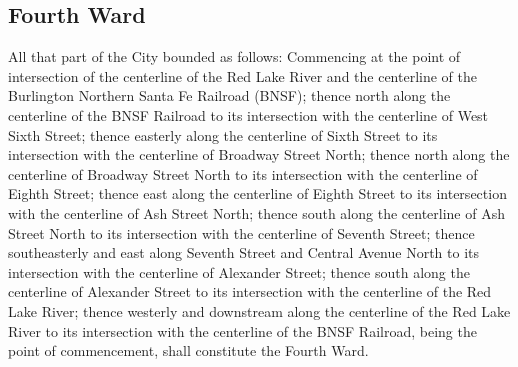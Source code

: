 \subsection{Fourth Ward}
All that part of the City bounded as follows:  Commencing at the point of intersection of the centerline of the Red Lake River and the centerline of the Burlington Northern Santa Fe Railroad (BNSF); thence north along the centerline of the BNSF Railroad to its intersection with the centerline of West Sixth Street; thence easterly along the centerline of Sixth Street to its intersection with the centerline of Broadway Street North; thence north along the centerline of Broadway Street North to its intersection with the centerline of Eighth Street; thence east along the centerline of Eighth Street to its intersection with the centerline of Ash Street North; thence south along the centerline of Ash Street North to its intersection with the centerline of Seventh Street; thence southeasterly and east along Seventh Street and Central Avenue North to its intersection with the centerline of Alexander Street; thence south along the centerline of Alexander Street to its intersection with the centerline of the Red Lake River; thence westerly and downstream along the centerline of the Red Lake River to its intersection with the centerline of the BNSF Railroad, being the point of commencement, shall constitute the Fourth Ward.

